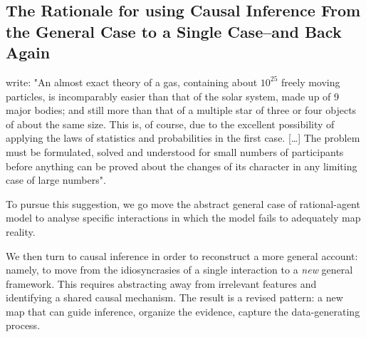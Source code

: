 \subsection{The Rationale for using Causal Inference \newline \small{From the General Case to a Single Case--and Back Again}}
\textcite[chap.~2, p.~14]{vonneumannTheoryGamesEconomic1990} write: "An almost exact theory of a gas, containing about \(10^{25}\) freely moving particles, is incomparably easier than that of the solar system, made up of 9 major bodies; and still more than that of a multiple star of three or four objects of about the same size. This is, of course, due to the excellent possibility of applying the laws of statistics and probabilities in the first case. [\dots] The problem must be formulated, solved and understood for small numbers of participants before anything can be proved about the changes of its character in any limiting case of large numbers".

\vspace*{1em}
To pursue this suggestion, we go move the abstract general case of rational-agent model to analyse specific interactions in which the model fails to adequately map reality.

We then turn to causal inference in order to reconstruct a more general account: namely, to move from the idiosyncrasies of a single interaction to a \textit{new} general framework. This requires abstracting away from irrelevant features and identifying a shared causal mechanism. The result is a revised pattern: a new map that can guide inference, organize the evidence, capture the data-generating process.

